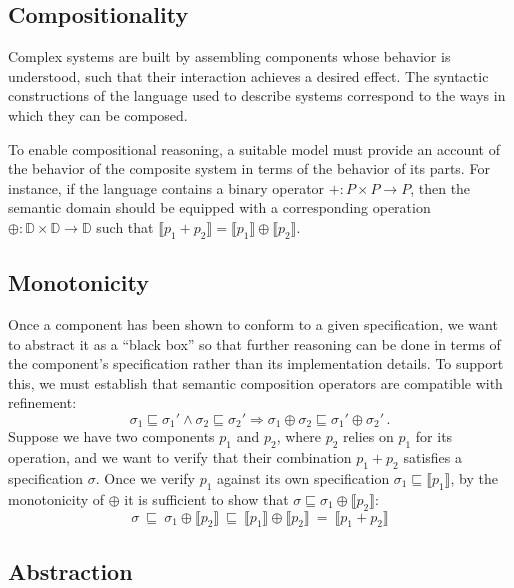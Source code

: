 \documentclass[draft,11pt]{report}
\newcommand{\refby}{\sqsubseteq} %
\begin{document}

\subsection{Compositionality} %

Complex systems are built by assembling components
whose behavior is understood,
such that their interaction achieves a desired effect.
The syntactic constructions of
the language used to describe systems
correspond to the ways in which they can be composed.

To enable compositional reasoning,
a suitable model must provide an account of
the behavior of the composite system
in terms of the behavior of its parts.
For instance,
if the language contains a binary operator
${+} : P \times P \rightarrow P$,
then the semantic domain should be equipped with
a corresponding operation
${\oplus} : \mathbb{D} \times \mathbb{D} \rightarrow \mathbb{D}$
such that
$\llbracket p_1 + p_2 \rrbracket =
 \llbracket p_1 \rrbracket \oplus \llbracket p_2 \rrbracket$.


\subsection{Monotonicity} %

Once a component has been shown to conform to a given specification,
we want to abstract it as a ``black box''
so that further reasoning can be done in terms of
the component's specification rather than its implementation details.
To support this,
we must establish that semantic composition operators
are compatible with refinement:
\[ \sigma_1 \refby \sigma_1' \wedge
   \sigma_2 \refby \sigma_2' \Rightarrow
   \sigma_1 \oplus \sigma_2 \refby \sigma_1' \oplus \sigma_2' \,. \]
Suppose we have two components $p_1$ and $p_2$,
where $p_2$ relies on $p_1$ for its operation,
and we want to verify that their combination $p_1 + p_2$
satisfies a specification $\sigma$.
Once we verify $p_1$ against its own specification
$\sigma_1 \refby \llbracket p_1 \rrbracket$,
by the monotonicity of ${\oplus}$ it is sufficient to show that
$\sigma \refby \sigma_1 \oplus \llbracket p_2 \rrbracket$:
\[
   \sigma \:\refby\:
   \sigma_1 \oplus \llbracket p_2 \rrbracket \:\refby\:
   \llbracket p_1 \rrbracket \oplus \llbracket p_2 \rrbracket \:=\:
   \llbracket p_1 + p_2 \rrbracket
\]


\subsection{Abstraction} %
\end{document}
